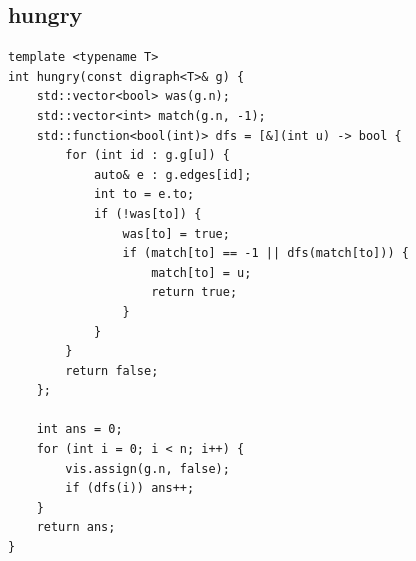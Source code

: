 \documentclass[twoside]{article}
\begin{document}
\subsection{hungry}
\begin{lstlisting}
template <typename T>
int hungry(const digraph<T>& g) {
    std::vector<bool> was(g.n);
    std::vector<int> match(g.n, -1);
    std::function<bool(int)> dfs = [&](int u) -> bool {
        for (int id : g.g[u]) {
            auto& e : g.edges[id];
            int to = e.to;
            if (!was[to]) {
                was[to] = true;
                if (match[to] == -1 || dfs(match[to])) {
                    match[to] = u;
                    return true;
                }
            }
        }
        return false;
    };

    int ans = 0;
    for (int i = 0; i < n; i++) {
        vis.assign(g.n, false);
        if (dfs(i)) ans++;
    }
    return ans;
}\end{lstlisting}
\end{document}
